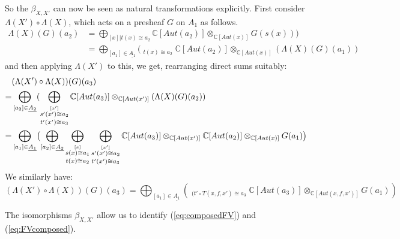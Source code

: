 \documentclass[10pt]{amsart}
\numberwithin{theorem}{subsection}
\newcommand{\FV}{\Lambda}
\begin{document}
So the $\beta_{X,X'}$ can now be seen as natural transformations explicitly. First consider $\FV({X'}) \circ \FV(X)$, which acts on a presheaf $G$ on $A_1$ as follows.
\begin{align}\label{eq:firststepFV}
\FV(X)(G)(a_2) & = \bigoplus_{[x] | t(x) \cong a_2} \mathbb{C}[Aut(a_2)] \otimes_{\mathbb{C}[Aut(x)]} G(s(x)) ) \\
\nonumber & = \bigoplus_{[a_1] \in \underline{A_1}} (\mathop{\bigoplus_{\stackrel{[x]}{s(x) \cong a_1}}}_{{t(x) \cong a_2}} \mathbb{C}[Aut(a_2)] \otimes_{\mathbb{C}[Aut(x)]} (\FV(X)(G)(a_1))
\end{align}
and then applying $\FV(X')$ to this, we get, rearranging direct sums suitably:
\begin{align}\label{eq:composedFV}
& (\FV({X'}) \circ \FV(X))(G)(a_3) \\
\nonumber = & \bigoplus_{[a_2] \in \underline{A_2}} (\mathop{\bigoplus_{\stackrel{[x']}{s'(x') \cong a_2}}}_{{t'(x') \cong a_3}} \mathbb{C}[Aut(a_3)] \otimes_{\mathbb{C}[Aut({x'})]} (\FV(X)(G)(a_2)) \\
\nonumber = &  \bigoplus_{[a_1] \in \underline{A_1}} \bigl{(} \bigoplus_{[a_2] \in \underline{A_2}} \mathop{\bigoplus_{\stackrel{[x]}{s(x) \cong a_1}}}_{{t(x) \cong a_2}}   \mathop{\bigoplus_{\stackrel{[x']}{s'(x') \cong a_2}}}_{{t'(x') \cong a_3}} \mathbb{C}[Aut(a_3)] \otimes_{\mathbb{C}[Aut({x'})]} \mathbb{C}[Aut(a_2)] \otimes_{\mathbb{C}[Aut(x)]} G(a_1) \bigr{)}
\end{align}
We similarly have:
\begin{equation}\label{eq:FVcomposed}
(\FV(X') \circ \FV(X))(G)(a_3) = \bigoplus_{[a_1] \in \underline{A_1}} ( \mathop{\bigoplus_{\stackrel{[(x,f,x')]}{((s\circ S)(x,f,x') \cong a_1}}}_{{(t'\circ T(x,f,x') \cong a_3}} \mathbb{C}[Aut(a_3)] \otimes_{\mathbb{C}[Aut(x,f,x')]} G(a_1) )
\end{equation}

The isomorphisms $\beta_{X,X'}$ allow us to identify (\ref{eq:composedFV}) and (\ref{eq:FVcomposed}).
\end{document}
